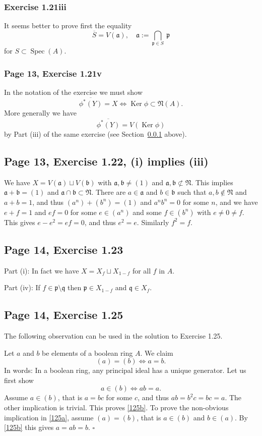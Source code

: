\documentclass[parskip=half,fontsize=12pt]{scrartcl}%
\newcommand{\mf}{\mathfrak}
\newcommand{\aaa}{\mf a}
\newcommand{\bbb}{\mf b}
\newcommand{\ppp}{\mf p}
\newcommand{\qqq}{\mf q}
\newcommand{\Ker}{\operatorname{Ker}}\newcommand{\Coker}{\operatorname{Coker}}
\newcommand{\Spec}{\operatorname{Spec}}\newcommand{\Sp}{\operatorname{Spec}}
\begin{document}
\subsubsection{Exercise 1.21iii}\label{121iii}%

It seems better to prove first the equality 
$$
\overline S=V(\mf a),\quad \mf a:=\bigcap_{\ppp\in S}\ \ppp
$$ 
for $S\subset\Spec(A)$.

\subsubsection{Page 13, Exercise 1.21v}\label{121v}%

In the notation of the exercise we must show 
$$
\overline{\phi^*(Y)}=X\iff\Ker\phi\subset\mf N(A).
$$ 
More generally we have 
$$
\overline{\phi^*(Y)}=V(\Ker\phi)
$$ 
by Part (iii) of the same exercise (see Section~\ref{121iii} above).

\subsection{Page 13, Exercise 1.22, (i) implies (iii)}%

We have $X=V(\aaa)\sqcup V(\bbb)$ with $\aaa,\bbb\ne(1)$ and $\aaa,\bbb\not\subset\mf N$. This implies $\aaa+\bbb=(1)$ and $\aaa\cap\bbb\subset\mf N$. There are $a\in\aaa$ and $b\in\bbb$ such that $a,b\notin\mf N$ and $a+b=1$, and thus $(a^n)+(b^n)=(1)$ and $a^nb^n=0$ for some $n$, and we have $e+f=1$ and $ef=0$ for some $e\in(a^n)$ and some $f\in(b^n)$ with $e\ne0\ne f$. This gives $e-e^2=ef=0$, and thus $e^2=e$. Similarly $f^2=f$.

\subsection{Page 14, Exercise 1.23}%

Part (i): In fact we have $X=X_f\sqcup X_{1-f}$ for all $f$ in $A$.

Part (iv): If $f\in\ppp\setminus\qqq$ then $\ppp\in X_{1-f}$ and $\qqq\in X_f$.

\subsection{Page 14, Exercise 1.25}%

The following observation can be used in the solution to Exercise 1.25.

Let $a$ and $b$ be elements of a boolean ring $A$. We claim
\begin{equation}\label{125a}
(a)=(b)\iff a=b.
\end{equation} 
In words: In a boolean ring, any principal ideal has a unique generator. Let us first show 
\begin{equation}\label{125b}
a\in(b)\iff ab=a.
\end{equation}
Assume $a\in(b)$, that is $a=bc$ for some $c$, and thus $ab=b^2c=bc=a$. The other implication is trivial. This proves \eqref{125b}. To prove the non-obvious implication in \eqref{125a}, assume $(a)=(b)$, that is $a\in(b)$ and $b\in(a)$. By \eqref{125b} this gives $a=ab=b$. $\square$
\end{document}
